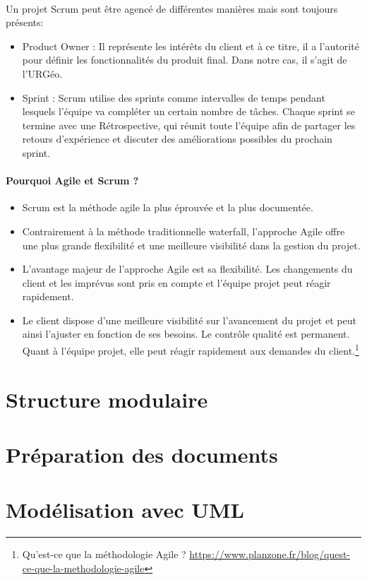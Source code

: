         \paragraph{}
        Un projet Scrum peut être agencé de différentes manières mais sont toujours présents:
        \begin{itemize}
                \item Product Owner : Il représente les intérêts du client et à ce titre, il a 
                l’autorité pour définir les fonctionnalités du produit final. Dans notre cas, il s'agit de l'URGéo.
                \item Sprint : Scrum utilise des sprints comme intervalles de temps pendant lesquels l’équipe 
                va compléter un certain nombre de tâches. Chaque sprint se termine avec une Rétrospective, qui réunit 
                toute l’équipe afin de partager les retours d’expérience et discuter des améliorations possibles du 
                prochain sprint.
        \end{itemize}

        \paragraph{Pourquoi Agile et Scrum ?}
        \begin{itemize}
                \item Scrum est la méthode agile la plus éprouvée et la plus documentée.
                \item Contrairement à la méthode traditionnelle waterfall, l'approche Agile offre une plus 
        grande flexibilité et une meilleure visibilité dans la gestion du projet. 
                \item L'avantage majeur de l'approche Agile est sa flexibilité. Les changements du client et les imprévus 
        sont pris en compte et l'équipe projet peut réagir rapidement.
                \item Le client dispose d'une meilleure visibilité sur l'avancement du projet et peut ainsi l'ajuster 
                en fonction de ses besoins. Le contrôle qualité est permanent. Quant à l'équipe projet, elle peut 
                réagir rapidement aux demandes du client.\footnote{Qu'est-ce que la méthodologie Agile ? \url{https://www.planzone.fr/blog/quest-ce-que-la-methodologie-agile}}
        \end{itemize}
        
        
        

        \section{Structure modulaire}
                \lipsum[1]
        \section{Préparation des documents}
                
        \section{Modélisation avec UML}
        
        
 